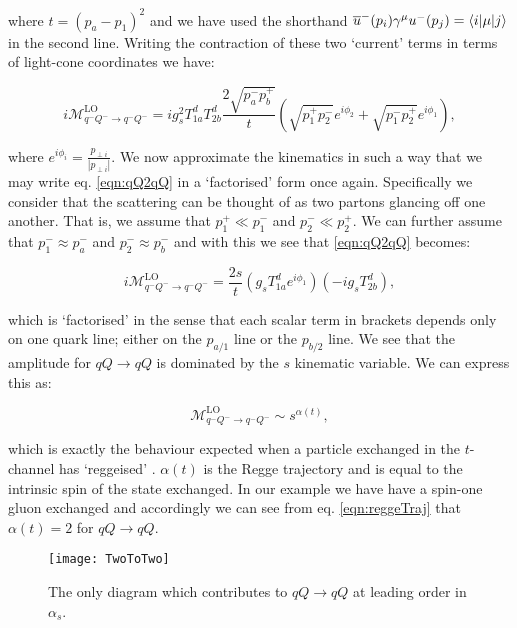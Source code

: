 		where $t = (p_a - p_1)^2$ and we have used the shorthand $\overline{u}^-(p_i)\gamma^\mu u^-(p_j) = \langle i | \mu | j \rangle$ in the second line.
		Writing the contraction of these two `current' terms in terms of light-cone coordinates we have:

		\begin{equation}
			i\mathcal{M}_{q^-Q^-\rightarrow q^-Q^-}^{\text{LO}} = ig_s^2T^d_{1a}T^d_{2b}\frac{2\sqrt{p_a^-p_b^+}}{t}
			\left(\sqrt{p_1^+p_2^-}e^{i\phi_2} + \sqrt{p_1^-p_2^+}e^{i\phi_1}\right),
			\label{eqn:qQ2qQ}
		\end{equation}

		where $e^{i\phi_i} = \frac{p_{\perp i}}{|p_{\perp i}|}$.  We now approximate the kinematics in such a way that we may write
		eq. \eqref{eqn:qQ2qQ} in a `factorised' form once again.  Specifically we consider that the scattering can be thought
		of as two partons glancing off one another.  That is, we assume that $p_1^+\ll p_1^-$ and $p_2^-\ll p_2^+$.  We can further
		assume that $p_1^-\approx p_a^-$ and $p_2^-\approx p_b^-$ and with this we see that \eqref{eqn:qQ2qQ} becomes:

		\begin{equation}
			i\mathcal{M}_{q^-Q^-\rightarrow q^-Q^-}^{\text{LO}} = \frac{2s}{t}\left(g_sT^d_{1a}e^{i\phi_1}\right)\left(-ig_sT^d_{2b}\right),
			\label{eqn:reggeTraj}
		\end{equation}

		which is `factorised' in the sense that each scalar term in brackets depends only on one quark line; either on the $p_{a/1}$
		line or the $p_{b/2}$ line.  We see that the amplitude for $qQ\rightarrow qQ$ is dominated by the $s$ kinematic variable.
		We can express this as:

		\begin{equation}
			\mathcal{M}_{q^-Q^-\rightarrow q^-Q^-}^{\text{LO}} \sim s^{\alpha(t)},
		\end{equation}

		which is exactly the behaviour expected when a particle exchanged in the $t$-channel has `reggeised'
		\cite{sabioThesis,DelDuca:1995hf,lipatovBook}.  $\alpha(t)$ is the Regge trajectory and is equal to
		the intrinsic spin of the state exchanged.  In our example we have have a spin-one gluon exchanged
		and accordingly we can see from eq. \eqref{eqn:reggeTraj} that $\alpha(t)=2$ for $qQ\rightarrow qQ$.

		\begin{figure}
			\begin{center}
			\texttt{[image: TwoToTwo]}
			\caption{The only diagram which contributes to $qQ\rightarrow qQ$ at leading order in $\alpha_s$.}
			\label{fig:TwoToTwo}
			\end{center}
		\end{figure}

